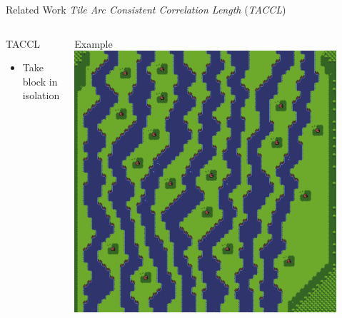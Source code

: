 \documentclass{beamer}
\begin{document}
  \begin{frame}[fragile]{Related Work}
    \textit{Tile Arc Consistent Correlation Length} (\textit{TACCL})
    \begin{columns}[T,onlytextwidth]
        \begin{block}{TACCL}
          \hfill \\
          \begin{itemize}
            \item Take block in isolation
          \end{itemize}
        \end{block}
        \begin{block}{Example}
          \includegraphics[width=0.9\textwidth]{img/forestmicro_64x64.pdf}
        \end{block}
    \end{columns}
  \end{frame}
\end{document}
